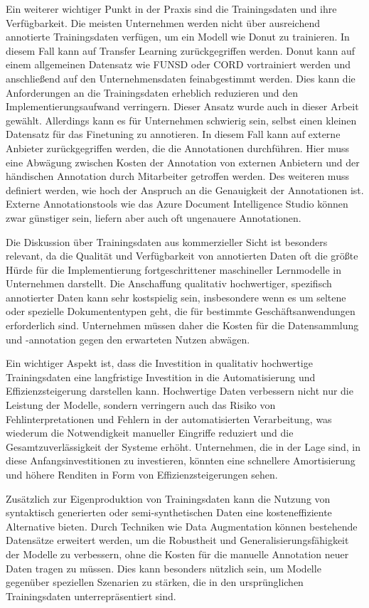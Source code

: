Ein weiterer wichtiger Punkt in der Praxis sind die Trainingsdaten und ihre Verfügbarkeit. Die meisten Unternehmen werden nicht über ausreichend annotierte Trainingsdaten verfügen, um ein Modell wie Donut zu trainieren. In diesem Fall kann auf Transfer Learning zurückgegriffen werden. Donut kann auf einem allgemeinen Datensatz wie FUNSD oder CORD vortrainiert werden und anschließend auf den Unternehmensdaten feinabgestimmt werden. Dies kann die Anforderungen an die Trainingsdaten erheblich reduzieren und den Implementierungsaufwand verringern. Dieser Ansatz wurde auch in dieser Arbeit gewählt. Allerdings kann es für Unternehmen schwierig sein, selbst einen kleinen Datensatz für das Finetuning zu annotieren. In diesem Fall kann auf externe Anbieter zurückgegriffen werden, die die Annotationen durchführen. Hier muss eine Abwägung zwischen Kosten der Annotation von externen Anbietern und der händischen Annotation durch Mitarbeiter getroffen werden. Des weiteren muss definiert werden, wie hoch der Anspruch an die Genauigkeit der Annotationen ist. Externe Annotationstools wie das Azure Document Intelligence Studio können zwar günstiger sein, liefern aber auch oft ungenauere Annotationen.

Die Diskussion über Trainingsdaten aus kommerzieller Sicht ist besonders relevant, da die Qualität und Verfügbarkeit von annotierten Daten oft die größte Hürde für die Implementierung fortgeschrittener maschineller Lernmodelle in Unternehmen darstellt. Die Anschaffung qualitativ hochwertiger, spezifisch annotierter Daten kann sehr kostspielig sein, insbesondere wenn es um seltene oder spezielle Dokumententypen geht, die für bestimmte Geschäftsanwendungen erforderlich sind. Unternehmen müssen daher die Kosten für die Datensammlung und -annotation gegen den erwarteten Nutzen abwägen.

Ein wichtiger Aspekt ist, dass die Investition in qualitativ hochwertige Trainingsdaten eine langfristige Investition in die Automatisierung und Effizienzsteigerung darstellen kann. Hochwertige Daten verbessern nicht nur die Leistung der Modelle, sondern verringern auch das Risiko von Fehlinterpretationen und Fehlern in der automatisierten Verarbeitung, was wiederum die Notwendigkeit manueller Eingriffe reduziert und die Gesamtzuverlässigkeit der Systeme erhöht. Unternehmen, die in der Lage sind, in diese Anfangsinvestitionen zu investieren, könnten eine schnellere Amortisierung und höhere Renditen in Form von Effizienzsteigerungen sehen.

Zusätzlich zur Eigenproduktion von Trainingsdaten kann die Nutzung von syntaktisch generierten oder semi-synthetischen Daten eine kosteneffiziente Alternative bieten. Durch Techniken wie Data Augmentation können bestehende Datensätze erweitert werden, um die Robustheit und Generalisierungsfähigkeit der Modelle zu verbessern, ohne die Kosten für die manuelle Annotation neuer Daten tragen zu müssen. Dies kann besonders nützlich sein, um Modelle gegenüber speziellen Szenarien zu stärken, die in den ursprünglichen Trainingsdaten unterrepräsentiert sind.